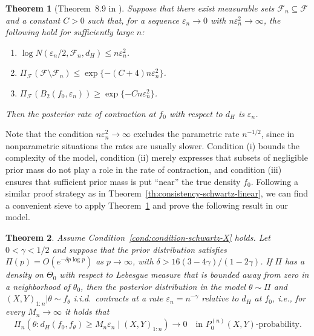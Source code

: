 \documentclass{article}
\numberwithin{equation}{section}
\theoremstyle{plain}
\newtheorem{theorem}{Theorem}
\theoremstyle{definition}
\renewcommand{\epsilon}{\varepsilon}
\begin{document}
\begin{theorem}[Theorem~8.9 in \citet{ghosal2017fundamentals}]\label{th:contraction-rate}
  Suppose that there exist measurable sets \(\mathcal{F}_n \subseteq \mathcal F\) and a constant \( C > 0 \) such that, for a sequence \(\epsilon_n \to 0\) with \( n\epsilon_n^2 \to \infty\), the following hold for sufficiently large \(n\):
  \begin{enumerate}[label=(\roman*)]
    \item \( \log N(\epsilon_n/2, \mathcal{F}_n, d_H) \leq n \epsilon_n^2\).
    \item \( \Pi_{\mathcal F}(\mathcal{F} \setminus \mathcal{F}_n) \leq \exp\{-(C+4)n \epsilon_n^2\}\).
    \item \( \Pi_{\mathcal F}(B_2(f_0, \epsilon_n)) \geq \exp\{-C n\epsilon_n^2\}\).
  \end{enumerate}
  Then the posterior rate of contraction at \(f_0 \) with respect to \(d_H\) is \(\epsilon_n \).
\end{theorem}

Note that the condition \(n\epsilon_n^2\to\infty\) excludes the parametric rate \(n^{-1/2}\), since in nonparametric situations the rates are usually slower. Condition (i) bounds the complexity of the model, condition (ii) merely expresses that subsets of negligible prior mass do not play a role in the rate of contraction, and condition (iii) ensures that sufficient prior mass is put ``near'' the true density \(f_0\). Following a similar proof strategy as in Theorem~\ref{th:consistency-schwartz-linear}, we can find a convenient sieve to apply Theorem~\ref{th:contraction-rate} and prove the following result in our model.

\begin{theorem}\label{th:contraction-rate-schwartz-linear}
Assume Condition~\ref{cond:condition-schwartz-X} holds. Let \(0<\gamma<1/2\) and suppose that the prior distribution satisfies \(\Pi(p)=O(e^{-\delta p \log p})\) as \(p\to\infty\), with \(\delta>16(3-4\gamma)/(1-2\gamma)\). If \(\Pi\) has a density on \(\Theta_0\) with respect to Lebesgue measure that is bounded away from zero in a neighborhood of \(\theta_0\), then the posterior distribution in the model \(\theta \sim \Pi\) and \((X,Y)_{1:n}|\theta \sim f_\theta\) i.i.d.\ contracts at a rate \(\epsilon_n= n^{-\gamma}\) relative to \(d_H\) at \(f_0\), i.e., for every \(M_n\to\infty\) it holds that
\[
    \Pi_n(\theta: d_H(f_0, f_\theta) \geq M_n \epsilon_n \mid (X,Y)_{1:n}) \to 0 \quad \text{in } P_0^{(n)}(X,Y)\text{-probability}.
    \]
\end{theorem}
\end{document}
